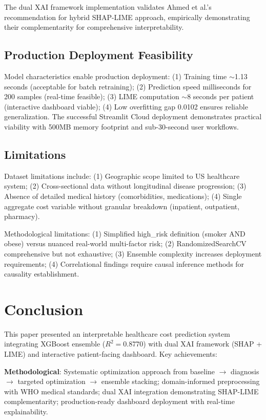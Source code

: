 \documentclass[conference]{IEEEtran}
\begin{document}
The dual XAI framework implementation validates Ahmed et al.'s \cite{ahmed2025} recommendation for hybrid SHAP-LIME approach, empirically demonstrating their complementarity for comprehensive interpretability.

\subsection{Production Deployment Feasibility}
Model characteristics enable production deployment: (1) Training time $\sim$1.13 seconds (acceptable for batch retraining); (2) Prediction speed milliseconds for 200 samples (real-time feasible); (3) LIME computation $\sim$8 seconds per patient (interactive dashboard viable); (4) Low overfitting gap 0.0102 ensures reliable generalization. The successful Streamlit Cloud deployment demonstrates practical viability with 500MB memory footprint and sub-30-second user workflows.

\subsection{Limitations}
Dataset limitations include: (1) Geographic scope limited to US healthcare system; (2) Cross-sectional data without longitudinal disease progression; (3) Absence of detailed medical history (comorbidities, medications); (4) Single aggregate cost variable without granular breakdown (inpatient, outpatient, pharmacy).

Methodological limitations: (1) Simplified high\_risk definition (smoker AND obese) versus nuanced real-world multi-factor risk; (2) RandomizedSearchCV comprehensive but not exhaustive; (3) Ensemble complexity increases deployment requirements; (4) Correlational findings require causal inference methods for causality establishment.

\section{Conclusion}
This paper presented an interpretable healthcare cost prediction system integrating XGBoost ensemble ($R^2 = 0.8770$) with dual XAI framework (SHAP + LIME) and interactive patient-facing dashboard. Key achievements:

\textbf{Methodological}: Systematic optimization approach from baseline $\rightarrow$ diagnosis $\rightarrow$ targeted optimization $\rightarrow$ ensemble stacking; domain-informed preprocessing with WHO medical standards; dual XAI integration demonstrating SHAP-LIME complementarity; production-ready dashboard deployment with real-time explainability.
\end{document}
